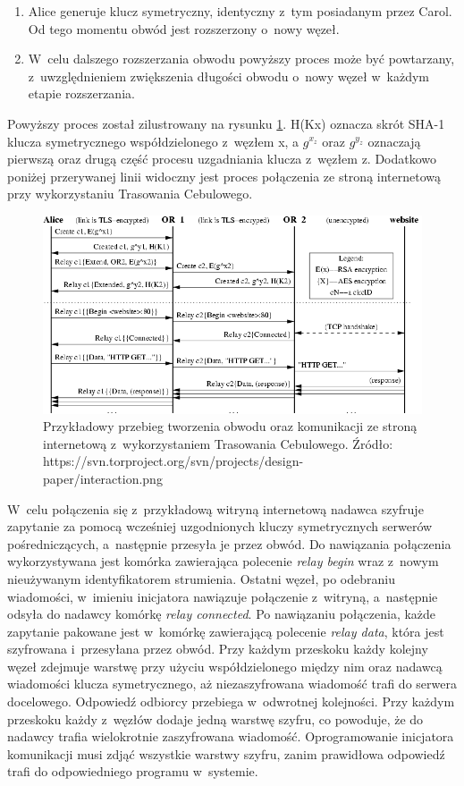 \begin{enumerate}
 \item Alice generuje klucz symetryczny, identyczny z~tym posiadanym przez Carol. Od tego momentu obwód jest rozszerzony o~nowy węzeł.
 \item W~celu dalszego rozszerzania obwodu powyższy proces może być powtarzany, z~uwzględnieniem zwiększenia długości obwodu o~nowy węzeł w~każdym etapie rozszerzania.
\end{enumerate}

Powyższy proces został zilustrowany na rysunku \ref{rys:circuit}. H(Kx) oznacza skrót SHA-1 klucza symetrycznego współdzielonego z~węzłem x, a $g^{x_z}$ oraz $g^{y_z}$ oznaczają pierwszą oraz drugą część procesu uzgadniania klucza z~węzłem z. Dodatkowo poniżej przerywanej linii widoczny jest proces połączenia ze stroną internetową przy wykorzystaniu Trasowania Cebulowego. 

\begin{figure}
 \centering
 \includegraphics[width=\textwidth]{interaction}
 \caption[Caption for LOR]{
  Przykładowy przebieg tworzenia obwodu oraz komunikacji ze stroną internetową z~wykorzystaniem Trasowania Cebulowego.\newline
  Źródło: https://svn.torproject.org/svn/projects/design-paper/interaction.png
 }
 \label{rys:circuit}
\end{figure}

W~celu połączenia się z~przykładową witryną internetową nadawca szyfruje zapytanie za pomocą wcześniej uzgodnionych kluczy symetrycznych serwerów pośredniczących, a~następnie przesyła je przez obwód. Do nawiązania połączenia wykorzystywana jest komórka zawierająca polecenie \textit{relay begin} wraz z~nowym nieużywanym identyfikatorem strumienia. Ostatni węzeł, po odebraniu wiadomości, w~imieniu inicjatora nawiązuje połączenie z~witryną, a~następnie odsyła do nadawcy komórkę \textit{relay connected}. Po nawiązaniu połączenia, każde zapytanie pakowane jest w~komórkę zawierającą polecenie \textit{relay data}, która jest szyfrowana i~przesyłana przez obwód. Przy każdym przeskoku każdy kolejny węzeł zdejmuje warstwę przy użyciu współdzielonego między nim oraz nadawcą wiadomości klucza symetrycznego, aż niezaszyfrowana wiadomość trafi do serwera docelowego. Odpowiedź odbiorcy przebiega w~odwrotnej kolejności. Przy każdym przeskoku każdy z~węzłów dodaje jedną warstwę szyfru, co powoduje, że do nadawcy trafia wielokrotnie zaszyfrowana wiadomość. Oprogramowanie inicjatora komunikacji musi zdjąć wszystkie warstwy szyfru, zanim prawidłowa odpowiedź trafi do odpowiedniego programu w~systemie\cite{tor_design}.

